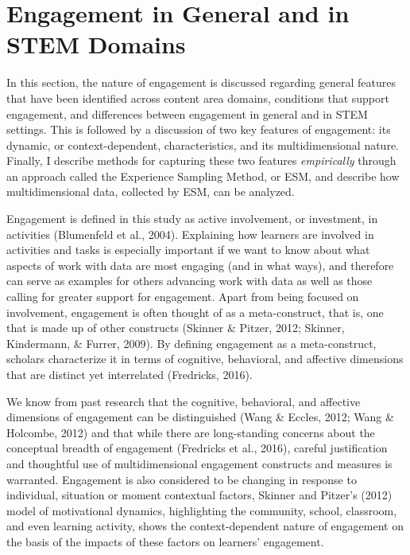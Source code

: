 \documentclass[]{msu-thesis}
\theoremstyle{definition}
\theoremstyle{definition}
\theoremstyle{definition}
\theoremstyle{remark}
\begin{document}
\section{Engagement in General and in STEM
Domains}\label{engagement-in-general-and-in-stem-domains}

In this section, the nature of engagement is discussed regarding general
features that have been identified across content area domains,
conditions that support engagement, and differences between engagement
in general and in STEM settings. This is followed by a discussion of two
key features of engagement: its dynamic, or context-dependent,
characteristics, and its multidimensional nature. Finally, I describe
methods for capturing these two features \emph{empirically} through an
approach called the Experience Sampling Method, or ESM, and describe how
multidimensional data, collected by ESM, can be analyzed.

Engagement is defined in this study as active involvement, or
investment, in activities (Blumenfeld et al., 2004). Explaining how
learners are involved in activities and tasks is especially important if
we want to know about what aspects of work with data are most engaging
(and in what ways), and therefore can serve as examples for others
advancing work with data as well as those calling for greater support
for engagement. Apart from being focused on involvement, engagement is
often thought of as a meta-construct, that is, one that is made up of
other constructs (Skinner \& Pitzer, 2012; Skinner, Kindermann, \&
Furrer, 2009). By defining engagement as a meta-construct, scholars
characterize it in terms of cognitive, behavioral, and affective
dimensions that are distinct yet interrelated (Fredricks, 2016).

We know from past research that the cognitive, behavioral, and affective
dimensions of engagement can be distinguished (Wang \& Eccles, 2012;
Wang \& Holcombe, 2012) and that while there are long-standing concerns
about the conceptual breadth of engagement (Fredricks et al., 2016),
careful justification and thoughtful use of multidimensional engagement
constructs and measures is warranted. Engagement is also considered to
be changing in response to individual, situation or moment contextual
factors, Skinner and Pitzer's (2012) model of motivational dynamics,
highlighting the community, school, classroom, and even learning
activity, shows the context-dependent nature of engagement on the basis
of the impacts of these factors on learners' engagement.
\end{document}

